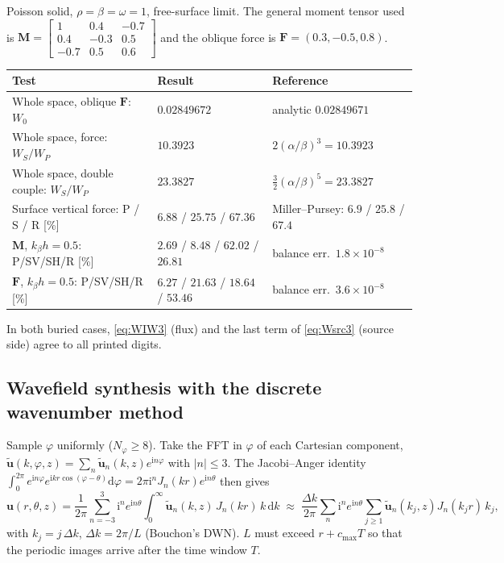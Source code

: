 \documentclass[11pt,a4paper]{article}
\newcommand{\ii}{\mathrm{i}}
\newcommand{\dd}{\mathrm{d}}
\begin{document}
Poisson solid, $\rho=\beta=\omega=1$, free-surface limit. The general moment tensor used is
$\mathbf M=\left[\begin{smallmatrix}1&0.4&-0.7\\0.4&-0.3&0.5\\-0.7&0.5&0.6\end{smallmatrix}\right]$ and the
oblique force is $\mathbf F=(0.3,-0.5,0.8)$.
\begin{center}
\small
\renewcommand{\arraystretch}{1.2}
\begin{tabular}{@{}lll@{}}
\toprule
Test & Result & Reference\\
\midrule
Whole space, oblique $\mathbf F$: $W_0$ & $0.02849672$ & analytic $0.02849671$\\
Whole space, force: $W_S/W_P$ & $10.3923$ & $2(\alpha/\beta)^3=10.3923$\\
Whole space, double couple: $W_S/W_P$ & $23.3827$ & $\tfrac32(\alpha/\beta)^5=23.3827$\\
Surface vertical force: P / S / R [\%] & $6.88$ / $25.75$ / $67.36$ & Miller--Pursey: $6.9$ / $25.8$ / $67.4$\\
$\mathbf M$, $k_\beta h=0.5$: P/SV/SH/R [\%] & $2.69$ / $8.48$ / $62.02$ / $26.81$ & balance err.\ $1.8\times10^{-8}$\\
$\mathbf F$, $k_\beta h=0.5$: P/SV/SH/R [\%] & $6.27$ / $21.63$ / $18.64$ / $53.46$ & balance err.\ $3.6\times10^{-8}$\\
\bottomrule
\end{tabular}
\end{center}
In both buried cases, \eqref{eq:WIW3} (flux) and the last term of \eqref{eq:Wsrc3} (source side)
agree to all printed digits.

\subsection{Wavefield synthesis with the discrete wavenumber method}

Sample $\varphi$ uniformly ($N_\varphi\ge8$). Take the FFT in $\varphi$ of each Cartesian component,
$\tilde{\mathbf u}(k,\varphi,z)=\sum_n\tilde{\mathbf u}_n(k,z)e^{\ii n\varphi}$ with $|n|\le3$. The
Jacobi--Anger identity $\int_0^{2\pi}e^{\ii n\varphi}e^{\ii kr\cos(\varphi-\theta)}\dd\varphi=2\pi\ii^nJ_n(kr)e^{\ii n\theta}$
then gives
\begin{equation}
  \mathbf u(r,\theta,z)=\frac{1}{2\pi}\sum_{n=-3}^{3}\ii^n e^{\ii n\theta}
  \int_0^\infty\tilde{\mathbf u}_n(k,z)\,J_n(kr)\,k\,\dd k
  \;\approx\;\frac{\Delta k}{2\pi}\sum_{n}\ii^n e^{\ii n\theta}\sum_{j\ge1}\tilde{\mathbf u}_n(k_j,z)J_n(k_jr)\,k_j,
\end{equation}
with $k_j=j\,\Delta k$, $\Delta k=2\pi/L$ (Bouchon's DWN). $L$ must exceed $r+c_{\max}T$ so that the
periodic images arrive after the time window $T$.
\end{document}
